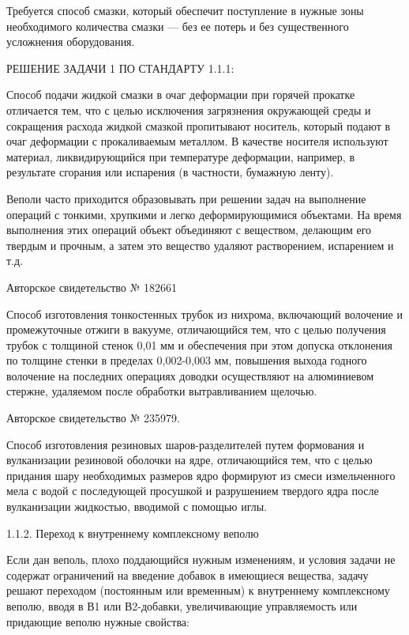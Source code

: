 Требуется способ  смазки, который обеспечит поступление  в нужные зоны
необходимого количества  смазки —  без ее  потерь и  без существенного
усложнения оборудования.

РЕШЕНИЕ ЗАДАЧИ 1 ПО СТАНДАРТУ 1.1.1:

Способ подачи  жидкой смазки  в очаг  деформации при  горячей прокатке
отличается тем, что с целью  исключения загрязнения окружающей среды и
сокращения расхода жидкой смазкой пропитывают носитель, который подают
в  очаг  деформации  с  прокаливаемым металлом.  В  качестве  носителя
используют  материал,  ликвидирующийся   при  температуре  деформации,
например, в  результате сгорания или испарения  (в частности, бумажную
ленту).

Веполи часто  приходится образовывать при решении  задач на выполнение
операций с  тонкими, хрупкими  и легко деформирующимися  объектами. На
время выполнения этих операций объект объединяют с веществом, делающим
его  твердым и  прочным, а  затем это  вещество удаляют  растворением,
испарением и т.д.

Авторское свидетельство № 182661

Способ  изготовления   тонкостенных  трубок  из   нихрома,  включающий
волочение и  промежуточные отжиги в  вакууме, отличающийся тем,  что с
целью получения  трубок с  толщиной стенок 0,01  мм и  обеспечения при
этом допуска отклонения  по толщине стенки в  пределах 0,002-0,003 мм,
повышения  выхода годного  волочение  на  последних операциях  доводки
осуществляют  на   алюминиевом  стержне,  удаляемом   после  обработки
вытравливанием щелочью.

Авторское свидетельство № 235979.

Способ  изготовления резиновых  шаров-разделителей путем  формования и
вулканизации  резиновой  оболочки на  ядре,  отличающийся  тем, что  с
целью  придания  шару необходимых  размеров  ядро  формируют из  смеси
измельченного  мела  с водой  с  последующей  просушкой и  разрушением
твердого ядра после вулканизации жидкостью, вводимой с помощью иглы.

1.1.2. Переход к внутреннему комплексному веполю

Если дан веполь, плохо поддающийся нужным изменениям, и условия задачи
не  содержат ограничений  на  введение добавок  в имеющиеся  вещества,
задачу  решают  переходом  (постоянным или  временным)  к  внутреннему
комплексному  веполю,   вводя  в  В1  или   В2-добавки,  увеличивающие
управляемость или придающие веполю нужные свойства:


